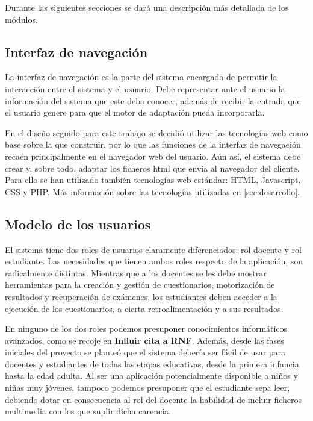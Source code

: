Durante las siguientes secciones se dará una descripción más detallada de los módulos.

\subsection{Interfaz de navegación}

La interfaz de navegación es la parte del sistema encargada de permitir la interacción entre el sistema y el usuario. Debe representar ante el usuario la información del sistema que este deba conocer, además de recibir la entrada que el usuario genere para que el motor de adaptación pueda incorporarla.

En el diseño seguido para este trabajo se decidió utilizar las tecnologías web como base sobre la que construir, por lo que las funciones de la interfaz de navegación recaén principalmente en el navegador web del usuario. Aún así, el sistema debe crear y, sobre todo, adaptar los ficheros html que envía al navegador del cliente. Para ello se han utilizado también tecnologías web estándar: HTML, Javascript, CSS y PHP. Más información sobre las tecnologías utilizadas en \ref{sec:desarrollo}.

\subsection{Modelo de los usuarios}


El sistema tiene dos roles de usuarios claramente diferenciados: rol docente y rol estudiante. Las necesidades que tienen ambos roles respecto de la aplicación, son radicalmente distintas. Mientras que a los docentes se les debe mostrar herramientas para la creación y gestión de cuestionarios, motorización de resultados y recuperación de exámenes, los estudiantes deben acceder a la ejecución de los cuestionarios, a cierta retroalimentación y a sus resultados.

En ninguno de los dos roles podemos presuponer conocimientos informáticos avanzados, como se recoje en \textbf{Influir cita a RNF}. Además, desde las fases iniciales del proyecto se planteó que el sistema debería ser fácil de usar para docentes y estudiantes de todas las etapas educativas, desde la primera infancia hasta la edad adulta. Al ser una aplicación potencialmente disponible a niños y niñas muy jóvenes, tampoco podemos presuponer que el estudiante sepa leer, debiendo dotar en consecuencia al rol del docente la habilidad de incluir ficheros multimedia con los que suplir dicha carencia.


